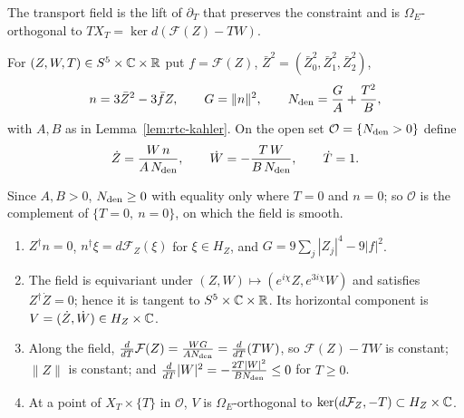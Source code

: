 The transport field is the lift of $\partial_T$ that preserves the constraint and is $\Omega_E$-orthogonal to $TX_T=\ker d(\mathcal F(Z)-TW)$.

\begin{construction}\label{cons:rtc-transport}
For $(Z,W,T)\in S^5\times\mathbb{C}\times\mathbb{R}$ put $f=\mathcal F(Z)$, $\bar Z^2=(\bar Z_0^2,\bar Z_1^2,\bar Z_2^2)$,
\[
 n=3\bar Z^2-3\bar fZ,\qquad G=\|n\|^2,\qquad N_{\rm den}=\frac GA+\frac{T^2}B ,
\]
with $A,B$ as in Lemma~\ref{lem:rtc-kahler}. On the open set $\mathcal O=\{N_{\rm den}>0\}$ define
\begin{equation}\label{eq:rtc-transport}
 \dot Z=\frac{W\,n}{A\,N_{\rm den}},\qquad \dot W=-\frac{T\,W}{B\,N_{\rm den}},\qquad \dot T=1 .
\end{equation}
\end{construction}

Since $A,B>0$, $N_{\rm den}\ge0$ with equality only where $T=0$ and $n=0$; so $\mathcal O$ is the complement of $\{T=0,\ n=0\}$, on which the field is smooth.

\begin{lemma}\label{lem:rtc-transport-field}
\begin{enumerate}[label=(\roman*)]
\item $Z^\dagger n=0$, $n^\dagger\xi=d\mathcal F_Z(\xi)$ for $\xi\in H_Z$, and $G=9\sum_j|Z_j|^4-9|f|^2$.
\item The field is equivariant under $(Z,W)\mapsto(e^{i\chi}Z,e^{3i\chi}W)$ and satisfies $Z^\dagger\dot Z=0$; hence it is
tangent to $S^5\times\mathbb{C}\times\mathbb{R}$. Its horizontal component is $V=(\dot Z,\dot W)\in H_Z\times\mathbb{C}$.
\item Along the field, $\frac{d}{dT}\mathcal F(Z)=\frac{WG}{AN_{\rm den}}=\frac{d}{dT}(TW)$, so $\mathcal F(Z)-TW$ is constant;
$\|Z\|$ is constant; and $\frac{d}{dT}|W|^2=-\frac{2T|W|^2}{BN_{\rm den}}\le0$ for $T\ge0$.
\item At a point of $X_T\times\{T\}$ in $\mathcal O$, $V$ is $\Omega_E$-orthogonal to $\ker(d\mathcal F_Z,-T)\subset H_Z\times\mathbb{C}$.
\end{enumerate}
\end{lemma}

